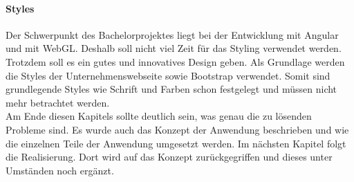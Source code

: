 \paragraph{Styles}Der Schwerpunkt des Bachelorprojektes liegt bei der Entwicklung mit Angular und mit WebGL. Deshalb soll nicht viel Zeit für das Styling verwendet werden. Trotzdem soll es ein gutes und innovatives Design geben. Als Grundlage werden die Styles der Unternehmenswebseite sowie Bootstrap verwendet. Somit sind grundlegende Styles wie Schrift und Farben schon festgelegt und müssen nicht mehr betrachtet werden.\\


Am Ende diesen Kapitels sollte deutlich sein, was genau die zu lösenden Probleme sind. Es wurde auch das Konzept der Anwendung beschrieben und wie die einzelnen Teile der Anwendung umgesetzt werden. Im nächsten Kapitel folgt die Realisierung. Dort wird auf das Konzept zurückgegriffen und dieses unter Umständen noch ergänzt.
%